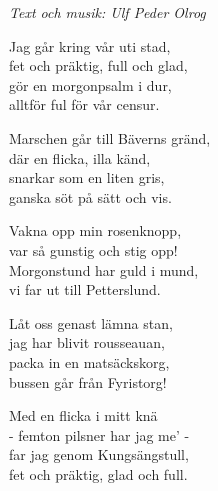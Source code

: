 {\footnotesize\textit{Text och musik: Ulf Peder Olrog}}\par
\vspace{10pt}
Jag går kring vår uti stad,\\
fet och präktig, full och glad,\\
gör en morgonpsalm i dur,\\
alltför ful för vår censur.\par
\vspace{10pt}
Marschen går till Bäverns gränd,\\
där en flicka, illa känd,\\
snarkar som en liten gris,\\
ganska söt på sätt och vis.\par
\vspace{10pt}
Vakna opp min rosenknopp,\\
var så gunstig och stig opp!\\
Morgonstund har guld i mund,\\
vi far ut till Petterslund.\par
\vspace{10pt}
Låt oss genast lämna stan,\\
jag har blivit rousseauan,\\
packa in en matsäckskorg,\\
bussen går från Fyristorg!\par
\vspace{10pt}
Med en flicka i mitt knä\\
- femton pilsner har jag me’ -\\
far jag genom Kungsängstull,\\
fet och präktig, glad och full.
